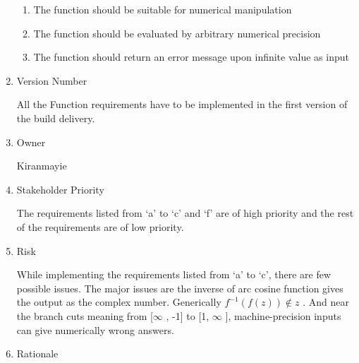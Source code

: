 \documentclass[12pt]{article}
\begin{document}
\begin{enumerate}
\begin{enumerate}
	\item The function should be suitable for numerical manipulation\par

	\item The function should be evaluated by arbitrary numerical precision\par

	\item The function should return an error message upon infinite value as input\par


\vspace{\baselineskip}

\end{enumerate}
	\item Version Number\par

All the Function requirements have to be implemented in the first version of the build delivery.\par


\vspace{\baselineskip}
	\item Owner\par

Kiranmayie\par


\vspace{\baselineskip}
	\item Stakeholder Priority\par

The requirements listed from ‘a’ to ‘c’ and ‘f’ are of high priority and the rest of the requirements are of low priority. \par


\vspace{\baselineskip}
	\item Risk\par

While implementing the requirements listed from ‘a’ to ‘c’, there are few possible issues. The major issues are the inverse of arc cosine function gives the output as the complex number. Generically  \( f^{-1} \left( f \left( z \right)  \right)  \notin z \) . And near the branch cuts meaning from [$\infty$ , -1] to [1, $\infty$ ], machine-precision inputs can give numerically wrong answers.\par


\vspace{\baselineskip}
	\item Rationale\par


\end{enumerate}
\end{document}
